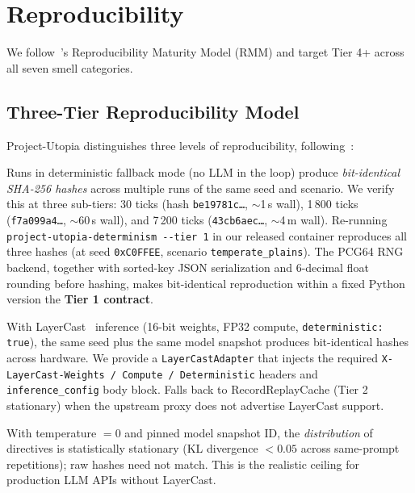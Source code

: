 \section{Reproducibility}
\label{sec:reproducibility}

We follow~\citet{Siddiq2025SoftwareReproducibility}'s Reproducibility
Maturity Model (RMM) and target Tier 4+ across all seven smell
categories.

\subsection{Three-Tier Reproducibility Model}

Project-Utopia distinguishes three levels of reproducibility,
following~\citet{Yuan2025LayerCast}:

\begin{description}[leftmargin=*]
\item[\textbf{Tier 1 — Fallback bit-identical.}]
Runs in deterministic fallback mode (no LLM in the loop)
produce \emph{bit-identical SHA-256 hashes} across multiple
runs of the same seed and scenario. We verify this at three
sub-tiers:
30 ticks (hash \texttt{be19781c\ldots}, $\sim$1\,s wall),
1\,800 ticks (\texttt{f7a099a4\ldots}, $\sim$60\,s wall), and
7\,200 ticks (\texttt{43cb6aec\ldots}, $\sim$4\,m wall).
Re-running \verb|project-utopia-determinism --tier 1| in our
released container reproduces all three hashes
(at seed \texttt{0xC0FFEE}, scenario
\texttt{temperate\_plains}). The PCG64 RNG backend, together
with sorted-key JSON serialization and 6-decimal float
rounding before hashing, makes bit-identical reproduction
within a fixed Python version the \textbf{Tier 1 contract}.
\item[\textbf{Tier 2 — LLM-on bit-identical via LayerCast.}]
With LayerCast~\citep{Yuan2025LayerCast} inference (16-bit
weights, FP32 compute, \texttt{deterministic: true}), the same
seed plus the same model snapshot produces bit-identical
hashes across hardware. We provide a
\texttt{LayerCastAdapter} that injects the required
\texttt{X-LayerCast-Weights / Compute / Deterministic} headers and
\texttt{inference\_config} body block. Falls back to
RecordReplayCache (Tier 2 stationary) when the upstream
proxy does not advertise LayerCast support.
\item[\textbf{Tier 3 — Production-LLM stationary.}]
With temperature $= 0$ and pinned model snapshot ID, the
\emph{distribution} of directives is statistically stationary
(KL divergence $< 0.05$ across same-prompt repetitions); raw
hashes need not match. This is the realistic ceiling for
production LLM APIs without LayerCast.
\end{description}

